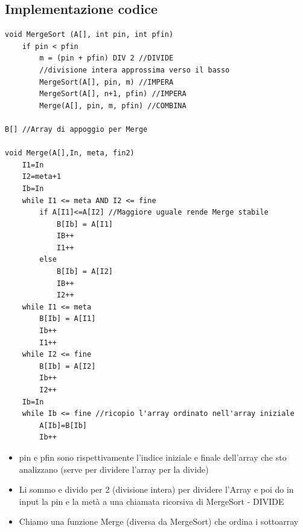 \subsection{Implementazione codice}
\begin{lstlisting}
void MergeSort (A[], int pin, int pfin)
    if pin < pfin
        m = (pin + pfin) DIV 2 //DIVIDE
        //divisione intera approssima verso il basso
        MergeSort(A[], pin, m) //IMPERA
        MergeSort(A[], n+1, pfin) //IMPERA
        Merge(A[], pin, m, pfin) //COMBINA

B[] //Array di appoggio per Merge

void Merge(A[],In, meta, fin2)
    I1=In
    I2=meta+1
    Ib=In
    while I1 <= meta AND I2 <= fine
        if A[I1]<=A[I2] //Maggiore uguale rende Merge stabile
            B[Ib] = A[I1]
            IB++
            I1++
        else
            B[Ib] = A[I2]
            IB++
            I2++
    while I1 <= meta
        B[Ib] = A[I1]
        Ib++
        I1++
    while I2 <= fine
        B[Ib] = A[I2]
        Ib++
        I2++
    Ib=In
    while Ib <= fine //ricopio l'array ordinato nell'array iniziale
        A[Ib]=B[Ib]
        Ib++
\end{lstlisting}
\begin{itemize}
    \item pin e pfin sono rispettivamente l'indice iniziale e finale dell'array che sto analizzano
    (serve per dividere l'array per la divide)
    \item Li sommo e divido per 2 (divisione intera) per dividere l'Array e poi do in input la pin e la metà
    a una chiamata ricorsiva di MergeSort - DIVIDE
    \item Chiamo una funzione Merge (diversa da MergeSort) che ordina i sottoarray
\end{itemize}
